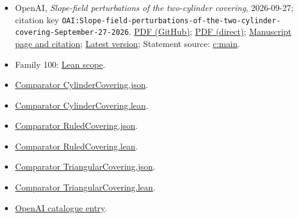 \documentclass[11pt]{article}
\begin{document}
\begin{itemize}
\item OpenAI, \emph{Slope-field perturbations of the two-cylinder covering}, 2026-09-27; citation key \texttt{OAI:Slope-field-perturbations-of-the-two-cylinder-covering-September-27-2026}. \href{https://github.com/openai/math/blob/adc7f1241b42e322a6451854ab7e4b4c146bf78a/preprints/Slope-field-perturbations-of-the-two-cylinder-covering-September-27-2026/main.pdf}{PDF (GitHub)}; \href{https://github.com/openai/math/raw/adc7f1241b42e322a6451854ab7e4b4c146bf78a/preprints/Slope-field-perturbations-of-the-two-cylinder-covering-September-27-2026/main.pdf}{PDF (direct)}; \href{https://github.com/openai/math/blob/adc7f1241b42e322a6451854ab7e4b4c146bf78a/preprints/Slope-field-perturbations-of-the-two-cylinder-covering-September-27-2026/README.md}{Manuscript page and citation}; \href{https://github.com/openai/math/blob/main/preprints/Slope-field-perturbations-of-the-two-cylinder-covering-September-27-2026/main.pdf}{Latest version}; Statement source: \href{https://github.com/openai/math/blob/adc7f1241b42e322a6451854ab7e4b4c146bf78a/preprints/Slope-field-perturbations-of-the-two-cylinder-covering-September-27-2026/build/sections/introduction.tex\#L51}{c:main}.
\item Family 100: \href{https://github.com/openai/math/blob/adc7f1241b42e322a6451854ab7e4b4c146bf78a/lean/docs/100.md}{Lean scope}.
\item \href{https://github.com/openai/math/blob/adc7f1241b42e322a6451854ab7e4b4c146bf78a/lean/ComparatorChallenges/CylinderCovering.json}{Comparator CylinderCovering.json}.
\item \href{https://github.com/openai/math/blob/adc7f1241b42e322a6451854ab7e4b4c146bf78a/lean/ComparatorChallenges/CylinderCovering.lean}{Comparator CylinderCovering.lean}.
\item \href{https://github.com/openai/math/blob/adc7f1241b42e322a6451854ab7e4b4c146bf78a/lean/ComparatorChallenges/RuledCovering.json}{Comparator RuledCovering.json}.
\item \href{https://github.com/openai/math/blob/adc7f1241b42e322a6451854ab7e4b4c146bf78a/lean/ComparatorChallenges/RuledCovering.lean}{Comparator RuledCovering.lean}.
\item \href{https://github.com/openai/math/blob/adc7f1241b42e322a6451854ab7e4b4c146bf78a/lean/ComparatorChallenges/TriangularCovering.json}{Comparator TriangularCovering.json}.
\item \href{https://github.com/openai/math/blob/adc7f1241b42e322a6451854ab7e4b4c146bf78a/lean/ComparatorChallenges/TriangularCovering.lean}{Comparator TriangularCovering.lean}.
\item \href{https://github.com/openai/math/blob/adc7f1241b42e322a6451854ab7e4b4c146bf78a/CONTENTS.md}{OpenAI catalogue entry}.
\end{itemize}
\end{document}
